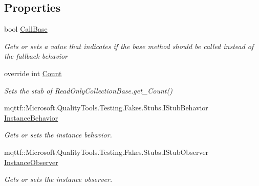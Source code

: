 \subsection*{Properties}
\begin{DoxyCompactItemize}
\item 
bool \hyperlink{class_system_1_1_security_1_1_authentication_1_1_extended_protection_1_1_fakes_1_1_stub_service_name_collection_a824645b9b3242a45d4c411cc6430ed78}{Call\-Base}
\begin{DoxyCompactList}\small\item\em Gets or sets a value that indicates if the base method should be called instead of the fallback behavior\end{DoxyCompactList}\item 
override int \hyperlink{class_system_1_1_security_1_1_authentication_1_1_extended_protection_1_1_fakes_1_1_stub_service_name_collection_a1458cbf235e69029ddeada009d5a3e64}{Count}
\begin{DoxyCompactList}\small\item\em Sets the stub of Read\-Only\-Collection\-Base.\-get\-\_\-\-Count()\end{DoxyCompactList}\item 
mqttf\-::\-Microsoft.\-Quality\-Tools.\-Testing.\-Fakes.\-Stubs.\-I\-Stub\-Behavior \hyperlink{class_system_1_1_security_1_1_authentication_1_1_extended_protection_1_1_fakes_1_1_stub_service_name_collection_af8c4fe8fa754efdec113e4caa65e2df3}{Instance\-Behavior}
\begin{DoxyCompactList}\small\item\em Gets or sets the instance behavior.\end{DoxyCompactList}\item 
mqttf\-::\-Microsoft.\-Quality\-Tools.\-Testing.\-Fakes.\-Stubs.\-I\-Stub\-Observer \hyperlink{class_system_1_1_security_1_1_authentication_1_1_extended_protection_1_1_fakes_1_1_stub_service_name_collection_a267e2f773124dbbf8a021074a0860c14}{Instance\-Observer}
\begin{DoxyCompactList}\small\item\em Gets or sets the instance observer.\end{DoxyCompactList}\end{DoxyCompactItemize}


